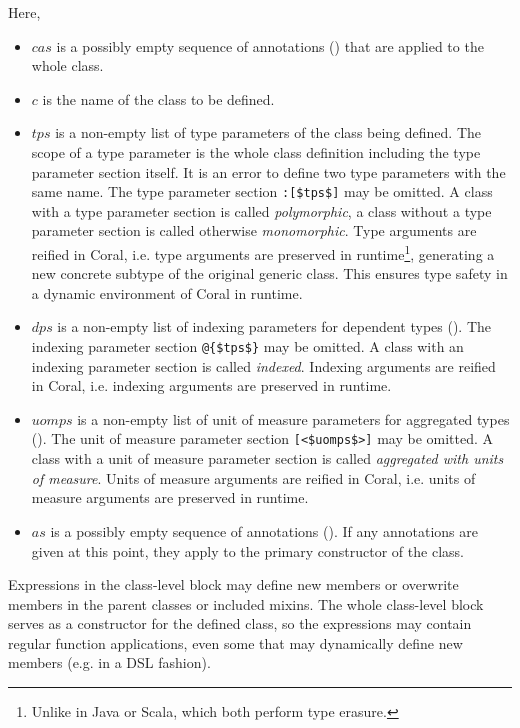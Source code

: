 Here, 
\begin{itemize}
\item[]
$cas$ is a possibly empty sequence of annotations () that are applied to the whole class. 

\item[]
$c$ is the name of the class to be defined. 

\item[]
$tps$ is a non-empty list of type parameters of the class being defined. The scope of a type parameter is the whole class definition including the type parameter section itself. It is an error to define two type parameters with the same name. The type parameter section \lstinline!:[$tps$]! may be omitted. A class with a type parameter section is called {\em polymorphic}, a class without a type parameter section is called otherwise {\em monomorphic}. Type arguments are reified in Coral, i.e. type arguments are preserved in runtime\footnote{Unlike in Java or Scala, which both perform type erasure.}, generating a new concrete subtype of the original generic class. This ensures type safety in a dynamic environment of Coral in runtime. 

\item[]
$dps$ is a non-empty list of indexing parameters for dependent types (). The indexing parameter section \lstinline!@{$tps$}! may be omitted. A class with an indexing parameter section is called {\em indexed}. Indexing arguments are reified in Coral, i.e. indexing arguments are preserved in runtime. 

\item[]
$uomps$ is a non-empty list of unit of measure parameters for aggregated types (). The unit of measure parameter section \lstinline![<$uomps$>]! may be omitted. A class with a unit of measure parameter section is called {\em aggregated with units of measure}. Units of measure arguments are reified in Coral, i.e. units of measure arguments are preserved in runtime. 

\item[]
$as$ is a possibly empty sequence of annotations (). If any annotations are given at this point, they apply to the primary constructor of the class. 

\end{itemize}

Expressions in the class-level block may define new members or overwrite members in the parent classes or included mixins. The whole class-level block serves as a constructor for the defined class, so the expressions may contain regular function applications, even some that may dynamically define new members (e.g. in a DSL fashion). 

